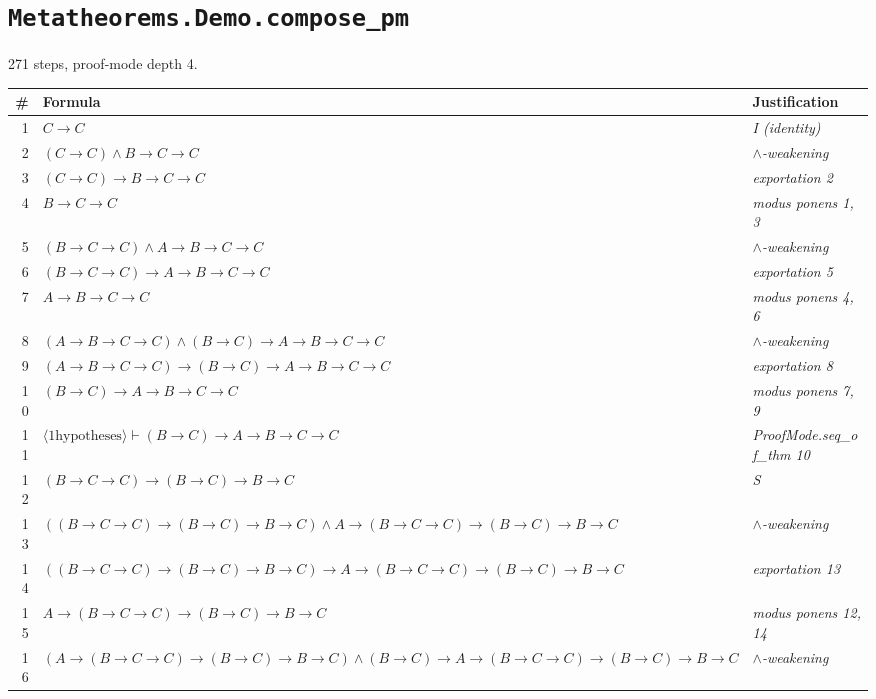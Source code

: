 \section*{\texttt{Metatheorems.Demo.compose\_pm}}
271 steps, proof-mode depth 4.

\begin{longtable}{r l l}
\hline
\# & Formula & Justification \\
\hline
\endhead
1 & $C  \to  C$ & \textit{I (identity)} \\
2 & $(C  \to  C)  \land  B  \to  C  \to  C$ & \textit{$\land$-weakening} \\
3 & $(C  \to  C)  \to  B  \to  C  \to  C$ & \textit{exportation 2} \\
4 & $B  \to  C  \to  C$ & \textit{modus ponens 1, 3} \\
5 & $(B  \to  C  \to  C)  \land  A  \to  B  \to  C  \to  C$ & \textit{$\land$-weakening} \\
6 & $(B  \to  C  \to  C)  \to  A  \to  B  \to  C  \to  C$ & \textit{exportation 5} \\
7 & $A  \to  B  \to  C  \to  C$ & \textit{modus ponens 4, 6} \\
8 & $(A  \to  B  \to  C  \to  C)  \land  (B  \to  C)  \to  A  \to  B  \to  C  \to  C$ & \textit{$\land$-weakening} \\
9 & $(A  \to  B  \to  C  \to  C)  \to  (B  \to  C)  \to  A  \to  B  \to  C  \to  C$ & \textit{exportation 8} \\
10 & $(B  \to  C)  \to  A  \to  B  \to  C  \to  C$ & \textit{modus ponens 7, 9} \\
11 & $\langle 1 \text{hypotheses}\rangle   \vdash  (B  \to  C)  \to  A  \to  B  \to  C  \to  C$ & \textit{ProofMode.seq\_of\_thm 10} \\
12 & $(B  \to  C  \to  C)  \to  (B  \to  C)  \to  B  \to  C$ & \textit{S} \\
13 & $((B  \to  C  \to  C)  \to  (B  \to  C)  \to  B  \to  C)  \land  A  \to  (B  \to  C  \to  C)  \to  (B  \to  C)  \to  B  \to  C$ & \textit{$\land$-weakening} \\
14 & $((B  \to  C  \to  C)  \to  (B  \to  C)  \to  B  \to  C)  \to  A  \to  (B  \to  C  \to  C)  \to  (B  \to  C)  \to  B  \to  C$ & \textit{exportation 13} \\
15 & $A  \to  (B  \to  C  \to  C)  \to  (B  \to  C)  \to  B  \to  C$ & \textit{modus ponens 12, 14} \\
16 & $(A  \to  (B  \to  C  \to  C)  \to  (B  \to  C)  \to  B  \to  C)  \land  (B  \to  C)  \to  A  \to  (B  \to  C  \to  C)  \to  (B  \to  C)  \to  B  \to  C$ & \textit{$\land$-weakening} \\

\end{longtable}
